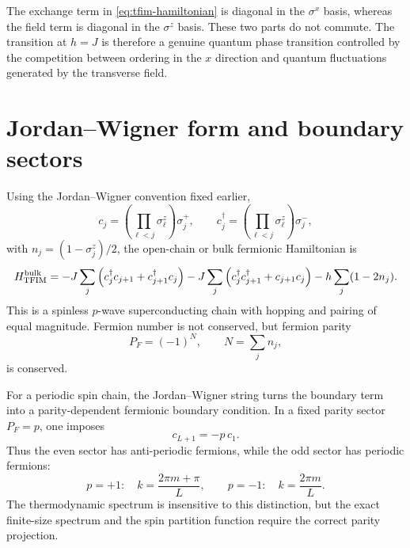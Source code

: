 \begin{remark}
The exchange term in \cref{eq:tfim-hamiltonian} is diagonal in the $\sigma^x$
basis, whereas the field term is diagonal in the $\sigma^z$ basis.  These two
parts do not commute.  The transition at $h=J$ is therefore a genuine quantum
phase transition controlled by the competition between ordering in the $x$
direction and quantum fluctuations generated by the transverse field.
\end{remark}

\section{Jordan--Wigner form and boundary sectors}
\label{sec:tfim-jw-form}

Using the Jordan--Wigner convention fixed earlier,
\begin{equation}
    c_j=
    \left(\prod_{\ell<j}\sigma_\ell^z\right)\sigma_j^+,
    \qquad
    c_j^\dagger=
    \left(\prod_{\ell<j}\sigma_\ell^z\right)\sigma_j^-,
\end{equation}
with $n_j=(1-\sigma_j^z)/2$, the open-chain or bulk fermionic Hamiltonian is
\begin{equation}
\label{eq:tfim-jw-bulk}
    H_{\rm TFIM}^{\rm bulk}
    =
    -J\sum_j
    \left(
        c_j^\dagger c_{j+1}+c_{j+1}^\dagger c_j
    \right)
    -J\sum_j
    \left(
        c_j^\dagger c_{j+1}^\dagger+c_{j+1}c_j
    \right)
    -h\sum_j(1-2n_j).
\end{equation}
This is a spinless $p$-wave superconducting chain with hopping and pairing of
equal magnitude.  Fermion number is not conserved, but fermion parity
\begin{equation}
\label{eq:tfim-fermion-parity}
    P_F=(-1)^N,
    \qquad
    N=\sum_j n_j,
\end{equation}
is conserved.

For a periodic spin chain, the Jordan--Wigner string turns the boundary term
into a parity-dependent fermionic boundary condition.  In a fixed parity sector
$P_F=p$, one imposes
\begin{equation}
\label{eq:tfim-parity-boundary-condition}
    c_{L+1}=-p\,c_1.
\end{equation}
Thus the even sector has anti-periodic fermions, while the odd sector has
periodic fermions:
\begin{equation}
\label{eq:tfim-sector-momenta}
    p=+1:
    \quad
    k=\frac{2\pi m+\pi}{L},
    \qquad
    p=-1:
    \quad
    k=\frac{2\pi m}{L}.
\end{equation}
The thermodynamic spectrum is insensitive to this distinction, but the exact
finite-size spectrum and the spin partition function require the correct parity
projection.

